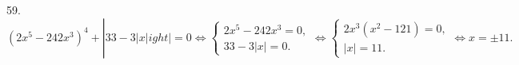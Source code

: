 59. $(2x^5-242x^3)^4+\left |33-3|x|
ight|=0\Leftrightarrow \begin{cases}2x^5-242x^3=0,\\
33-3|x|=0.\end{cases}\Leftrightarrow\begin{cases}2x^3(x^2-121)=0,\\
|x|=11.\end{cases}\Leftrightarrow x=\pm11.$\\
